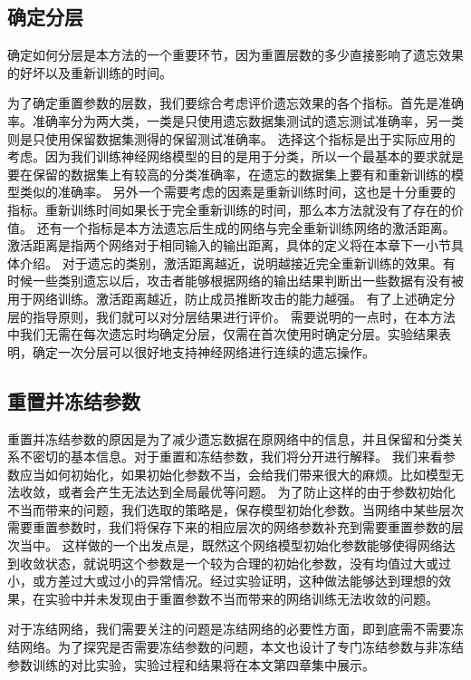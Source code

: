 \subsection{确定分层}
确定如何分层是本方法的一个重要环节，因为重置层数的多少直接影响了遗忘效果的好坏以及重新训练的时间。

为了确定重置参数的层数，我们要综合考虑评价遗忘效果的各个指标。首先是准确率。准确率分为两大类，一类是只使用遗忘数据集测试的遗忘测试准确率，另一类则是只使用保留数据集测得的保留测试准确率。
选择这个指标是出于实际应用的考虑。因为我们训练神经网络模型的目的是用于分类，所以一个最基本的要求就是要在保留的数据集上有较高的分类准确率，在遗忘的数据集上要有和重新训练的模型类似的准确率。
另外一个需要考虑的因素是重新训练时间，这也是十分重要的指标。重新训练时间如果长于完全重新训练的时间，那么本方法就没有了存在的价值。
还有一个指标是本方法遗忘后生成的网络与完全重新训练网络的激活距离。激活距离是指两个网络对于相同输入的输出距离，具体的定义将在本章下一小节具体介绍。
对于遗忘的类别，激活距离越近，说明越接近完全重新训练的效果。有时候一些类别遗忘以后，攻击者能够根据网络的输出结果判断出一些数据有没有被用于网络训练。激活距离越近，防止成员推断攻击的能力越强。
有了上述确定分层的指导原则，我们就可以对分层结果进行评价。
需要说明的一点时，在本方法中我们无需在每次遗忘时均确定分层，仅需在首次使用时确定分层。实验结果表明，确定一次分层可以很好地支持神经网络进行连续的遗忘操作。

\subsection{重置并冻结参数}
重置并冻结参数的原因是为了减少遗忘数据在原网络中的信息，并且保留和分类关系不密切的基本信息。对于重置和冻结参数，我们将分开进行解释。
我们来看参数应当如何初始化，如果初始化参数不当，会给我们带来很大的麻烦。比如模型无法收敛，或者会产生无法达到全局最优等问题。
为了防止这样的由于参数初始化不当而带来的问题，我们选取的策略是，保存模型初始化参数。当网络中某些层次需要重置参数时，我们将保存下来的相应层次的网络参数补充到需要重置参数的层次当中。
这样做的一个出发点是，既然这个网络模型初始化参数能够使得网络达到收敛状态，就说明这个参数是一个较为合理的初始化参数，没有均值过大或过小，或方差过大或过小的异常情况。经过实验证明，这种做法能够达到理想的效果，在实验中并未发现由于重置参数不当而带来的网络训练无法收敛的问题。

对于冻结网络，我们需要关注的问题是冻结网络的必要性方面，即到底需不需要冻结网络。为了探究是否需要冻结参数的问题，本文也设计了专门冻结参数与非冻结参数训练的对比实验，实验过程和结果将在本文第四章集中展示。

